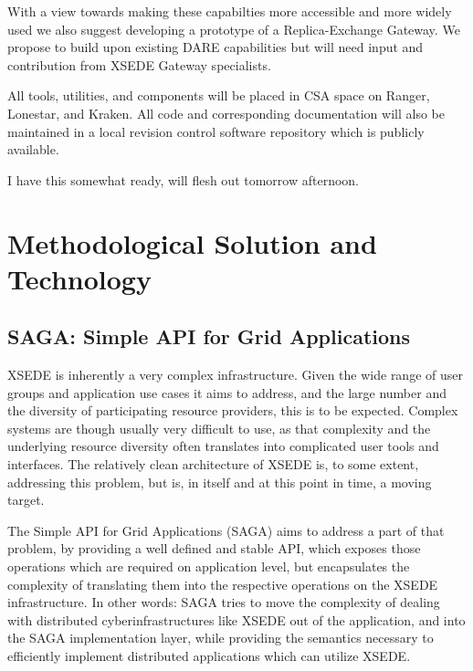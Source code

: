 \documentclass{sig-alternate}
\begin{document}
With a view towards making these capabilties more accessible  and more widely
used we also suggest developing a  prototype of a Replica-Exchange Gateway. We
propose to build upon existing DARE capabilities but will need input and
contribution from XSEDE  Gateway specialists.  

All tools, utilities, and components will be placed in CSA space on Ranger,
Lonestar, and Kraken. All code and corresponding documentation will also be
maintained in a local revision control software repository which is publicly
available.




I have this somewhat ready, will flesh out tomorrow
afternoon. 

\section{Methodological Solution and Technology}

\subsection{SAGA: Simple API for Grid Applications}
 \label{ssec:saga}

 XSEDE is inherently a very complex infrastructure.  Given the wide
 range of user groups and application use cases it aims to address,
 and the large number and the diversity of participating resource
 providers, this is to be expected.  Complex systems are though
 usually very difficult to use, as that complexity and the underlying
 resource diversity often translates into complicated user tools and
 interfaces.  The relatively clean architecture of XSEDE is, to some
 extent, addressing this problem, but is, in itself and at this point
 in time, a moving target.

 The Simple API for Grid Applications (SAGA) aims to address a part of
 that problem, by providing a well defined and stable API, which
 exposes those operations which are required on application level, but
 encapsulates the complexity of translating them into the respective
 operations on the XSEDE infrastructure.  In other words: SAGA tries
 to move the complexity of dealing with distributed
 cyberinfrastructures like XSEDE out of the application, and into the
 SAGA implementation layer, while providing the semantics necessary to
 efficiently implement distributed applications which can utilize
 XSEDE.
\end{document}
